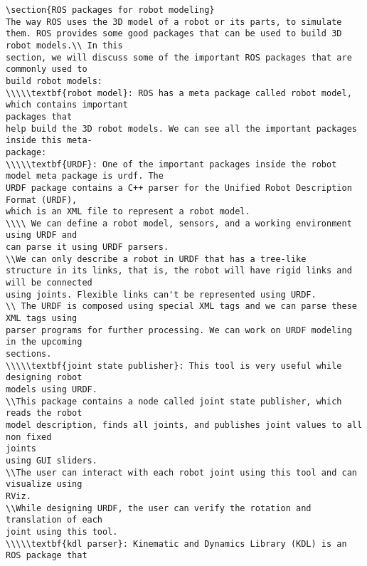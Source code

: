 \begin{lstlisting}
\section{ROS packages for robot modeling}
The way ROS uses the 3D model of a robot or its parts, to simulate them. ROS provides some good packages that can be used to build 3D robot models.\\ In this
section, we will discuss some of the important ROS packages that are commonly used to
build robot models:
\\\\\textbf{robot model}: ROS has a meta package called robot model, which contains important 
packages that 
help build the 3D robot models. We can see all the important packages inside this meta-
package:
\\\\\textbf{URDF}: One of the important packages inside the robot model meta package is urdf. The 
URDF package contains a C++ parser for the Unified Robot Description Format (URDF),
which is an XML file to represent a robot model.
\\\\ We can define a robot model, sensors, and a working environment using URDF and 
can parse it using URDF parsers.
\\We can only describe a robot in URDF that has a tree-like 
structure in its links, that is, the robot will have rigid links and will be connected 
using joints. Flexible links can't be represented using URDF.
\\ The URDF is composed using special XML tags and we can parse these XML tags using 
parser programs for further processing. We can work on URDF modeling in the upcoming 
sections.
\\\\\textbf{joint state publisher}: This tool is very useful while designing robot 
models using URDF.
\\This package contains a node called joint state publisher, which reads the robot 
model description, finds all joints, and publishes joint values to all non fixed 
joints 
using GUI sliders. 
\\The user can interact with each robot joint using this tool and can visualize using 
RViz.
\\While designing URDF, the user can verify the rotation and translation of each 
joint using this tool. 
\\\\\textbf{kdl parser}: Kinematic and Dynamics Library (KDL) is an ROS package that 

\end{lstlisting}
